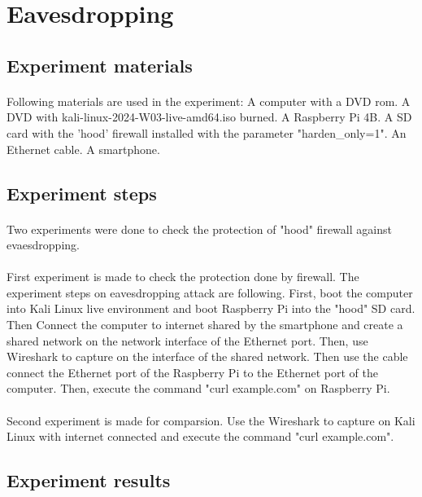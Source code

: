 \documentclass[mscthesis]{usiinfthesis}
\begin{document}
\section{Eavesdropping}

\subsection{Experiment materials}
\paragraph{}
Following materials are used in the experiment: A computer with a DVD rom. A DVD with kali-linux-2024-W03-live-amd64.iso burned. A Raspberry Pi 4B. A SD card with the 'hood' firewall installed with the parameter "harden\_only=1". An Ethernet cable. A smartphone.

\subsection{Experiment steps}
\paragraph{}
Two experiments were done to check the protection of "hood" firewall against evaesdropping.
\paragraph{}
First experiment is made to check the protection done by firewall. The experiment steps on eavesdropping attack are following. First, boot the computer into Kali Linux live environment and boot Raspberry Pi into the "hood" SD card. Then Connect the computer to internet shared by the smartphone and create a shared network on the network interface of the Ethernet port. Then, use Wireshark to capture on the interface of the shared network. Then use the cable connect the Ethernet port of the Raspberry Pi to the Ethernet port of the computer. Then, execute the command "curl example.com" on Raspberry Pi.
\paragraph{}
Second experiment is made for comparsion. Use the Wireshark to capture on Kali Linux with internet connected and execute the command "curl example.com".

\subsection{Experiment results}
\end{document}
